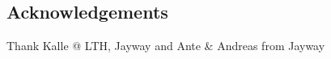 \begin{center}

\section*{Acknowledgements}
 Thank Kalle @ LTH, Jayway and Ante \& Andreas from Jayway 
\end{center}
\newpage
